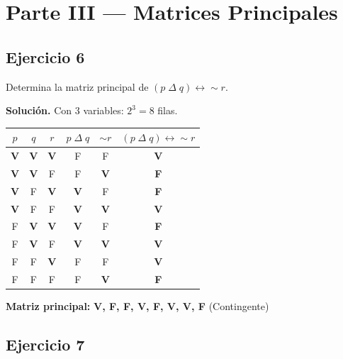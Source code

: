 \documentclass[12pt,a4paper]{article}
\newcommand{\V}{\textbf{V}}
\newcommand{\F}{F}
\newcommand{\resultado}[1]{\textcolor{verde}{\textbf{#1}}}
\begin{document}
\bigskip

\section{Parte III — Matrices Principales}

\subsection*{Ejercicio 6}

\begin{enunciado}
Determina la matriz principal de $(p \;\Delta\; q) \leftrightarrow \sim r$.
\end{enunciado}

\begin{solucion}
\textbf{Solución.} Con 3 variables: $2^3 = 8$ filas.

\begin{center}
\begin{tabular}{ccc|c|c|c}
\toprule
$p$ & $q$ & $r$ & $p \;\Delta\; q$ & $\sim r$ & $(p \;\Delta\; q)\leftrightarrow \sim r$ \\
\midrule
\V & \V & \V & \F & \F & \resultado{V} \\
\V & \V & \F & \F & \V & \resultado{F} \\
\V & \F & \V & \V & \F & \resultado{F} \\
\V & \F & \F & \V & \V & \resultado{V} \\
\F & \V & \V & \V & \F & \resultado{F} \\
\F & \V & \F & \V & \V & \resultado{V} \\
\F & \F & \V & \F & \F & \resultado{V} \\
\F & \F & \F & \F & \V & \resultado{F} \\
\bottomrule
\end{tabular}
\end{center}

\textbf{Matriz principal:} \resultado{V, F, F, V, F, V, V, F} \quad (Contingente)
\end{solucion}

\newpage

\subsection*{Ejercicio 7}
\end{document}
